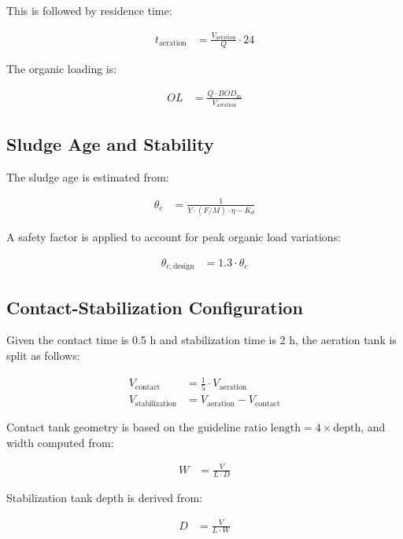 \documentclass[12pt]{article}
\begin{document}
This is followed by residence time:

\begin{align}
t_{\text{aeration}} &= \frac{V_{\text{aeration}}}{Q} \cdot 24
\end{align}

The organic loading is:

\begin{align}
OL &= \frac{Q \cdot BOD_{\text{in}}}{V_{\text{aeration}}}
\end{align}

\subsection{Sludge Age and Stability}

The sludge age is estimated from:

\begin{align}
\theta_c &= \frac{1}{Y \cdot (F/M) \cdot \eta - K_d}
\end{align}

A safety factor is applied to account for peak organic load variations:

\begin{align}
\theta_{c, \text{design}} &= 1.3 \cdot \theta_c
\end{align}

\subsection{Contact-Stabilization Configuration}

Given the contact time is 0.5 h and stabilization time is 2 h, the aeration tank is split as follows:

\begin{align}
V_{\text{contact}} &= \frac{1}{5} \cdot V_{\text{aeration}} \\
V_{\text{stabilization}} &= V_{\text{aeration}} - V_{\text{contact}}
\end{align}

Contact tank geometry is based on the guideline ratio \( \text{length} = 4 \times \text{depth} \), and width computed from:

\begin{align}
W &= \frac{V}{L \cdot D}
\end{align}

Stabilization tank depth is derived from:

\begin{align}
D &= \frac{V}{L \cdot W}
\end{align}
\end{document}

